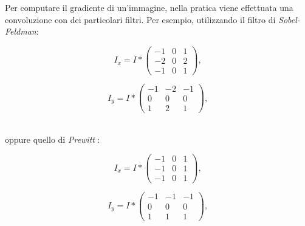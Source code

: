 Per computare il gradiente di un'immagine, nella pratica viene effettuata una convoluzione con dei particolari filtri. Per esempio, utilizzando il filtro di \textit{Sobel-Feldman}:\\
\vspace*{15pt}
\noindent\begin{minipage}{.5\linewidth}
	\begin{equation}
		I_{x} = I * 
			\begin{pmatrix}
				-1 & 0 & 1 \\
				-2 & 0 & 2\\
				-1 & 0 & 1
			\end{pmatrix},
		\label{eq:sobel-x}
	\end{equation}
\end{minipage}%
\begin{minipage}{.5\linewidth}
	\begin{equation}
		I_{y} = I * 
			\begin{pmatrix}
				-1 & -2 & -1 \\
				0 & 0 & 0\\
				1 & 2 & 1
			\end{pmatrix},
		\label{eq:sobel-y}
	\end{equation}
\end{minipage}\\
oppure quello di \textit{Prewitt} \cite{bib:prewitt}:\\
\noindent\begin{minipage}{.5\linewidth}
	\begin{equation}
		I_{x} = I * 
			\begin{pmatrix}
				-1 & 0 & 1 \\
				-1 & 0 & 1\\
				-1 & 0 & 1
			\end{pmatrix},
		\label{eq:prewitt-x}
	\end{equation}
\end{minipage}%
\begin{minipage}{.5\linewidth}
	\begin{equation}
		I_{y} = I * 
			\begin{pmatrix}
				-1 & -1 & -1 \\
				0 & 0 & 0\\
				1 & 1 & 1
			\end{pmatrix},
		\label{eq:prewitt-y}
	\end{equation}
\end{minipage}


